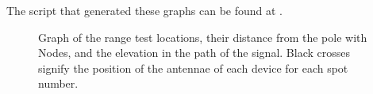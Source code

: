 
The script that generated these graphs can be found at .

\begin{figure}[H]
    \centering
    \subfloat[SF11]{} \hfil
    \subfloat[SF5]{}
    \caption{\label{fig:range-elevation}Graph of the range test locations, their distance from the pole with Nodes, and the elevation in the path of the signal. Black crosses signify the position of the antennae of each device for each spot number.}
\end{figure}

